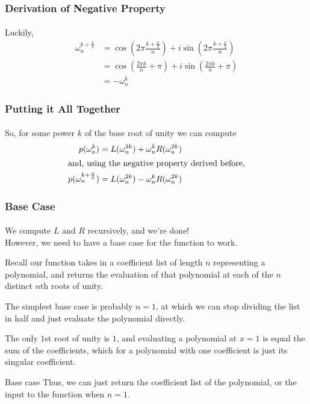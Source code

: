 \documentclass{beamer}                             %
\begin{document}
\begin{frame}
\frametitle{Derivation of Negative Property}
\framesubtitle{}
Luckily, 
\begin{align*}
  \omega^{k + \frac{n}{2}}_n &= \cos(2 \pi \frac{k + \frac{n}{2}}{n}) +
  i \sin(2 \pi \frac{k + \frac{n}{2}}{n}) \\
                             &= \cos(\frac{2 \pi k}{n} + \pi) +
                             i \sin(\frac{2 \pi k}{n} + \pi) \\
                             &= -\omega_n^k
\end{align*}
\end{frame}

\begin{frame}
\frametitle{Putting it All Together}
\framesubtitle{}
So, for some power \( k \) of the base root of unity we can compute
\begin{align*}
  p(\omega^k_n) &= L(\omega^{2k}_n) + \omega^k_n R(\omega^{2k}_n) \\
  \shortintertext{and, using the negative property derived before,}
  p(\omega^{k + \frac{n}{2}}_n) &= L(\omega^{2k}_n) - \omega^k_n R(\omega^{2k}_n) \\
\end{align*}
\end{frame}

\begin{frame}
\frametitle{Base Case}
\framesubtitle{}
We compute \( L \) and \( R \) recursively, and we're done! \\
However, we need to have a base case for the function to work. \pause

Recall our function takes in a coefficient list of length \( n \) representing a
polynomial, and returns the evaluation of that polynomial at each of the
\( n \) distinct \( n \)th roots of unity. \pause

The simplest base case is probably \( n = 1 \), at which we can stop dividing the
list in half and just evaluate the polynomial directly. \pause 

The only \( 1 \)st root of unity is \( 1 \), and evaluating a polynomial
at \( x = 1 \) is equal the sum of the coefficients, which for a
polynomial with one coefficient is just its singular coefficient. \pause

\begin{block}{Base case}
  Thus, we can just return the coefficient list of the polynomial,
  or the input to the function when \( n = 1 \). 
\end{block}
\end{frame}
\end{document}
